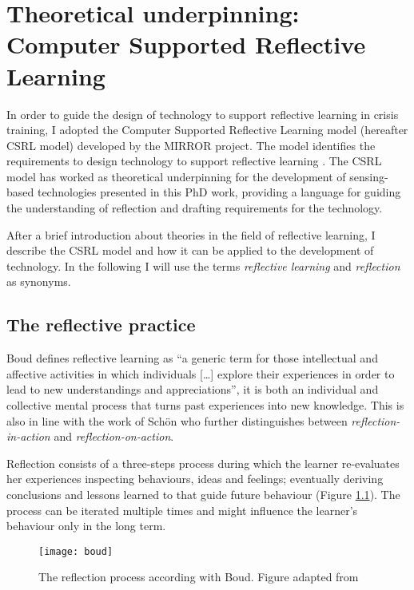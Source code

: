\chapter[Theoretical underpinning:\\ Computer Supported Reflective Learning][Computer Supported Reflective Learning]{Theoretical underpinning: Computer Supported Reflective Learning}\label{csrl}

In order to guide the design of technology to support reflective learning in crisis training, I adopted the Computer Supported Reflective Learning model (hereafter CSRL model) developed by the MIRROR project. The model identifies the requirements to design technology to support reflective learning \autocite{Krogstie:2013kf}. The CSRL model has worked as theoretical underpinning for the development of sensing-based technologies presented in this PhD work, providing a language for guiding the understanding of reflection and drafting requirements for the technology.

After a brief introduction about theories in the field of reflective learning, I describe the CSRL model and how it can be applied to the development of technology. In the following I will use the terms \emph{reflective learning} and \emph{reflection} as synonyms.

\section{The reflective practice}\label{reflection}

Boud \autocite*{boud1985reflection} defines reflective learning as ``a generic term for those intellectual and affective activities in which individuals {[}\ldots{}{]} explore their experiences in order to lead to new understandings and appreciations'', it is both an individual and collective mental process that turns past experiences into new knowledge. This is also in line with the work of Sch\"on \autocite*{Schon:1983ut} who further distinguishes between \emph{reflection-in-action} and \emph{reflection-on-action}.

Reflection consists of a three-steps process during which the learner re-evaluates her experiences inspecting behaviours, ideas and feelings; eventually deriving conclusions and lessons learned to that guide future behaviour (Figure \ref{fig:boud-model}). The process can be iterated multiple times and might influence the learner's behaviour only in the long term.

\begin{figure}
	[tbh] \centering 
	\texttt{[image: boud]} \caption{The reflection process according with Boud. Figure adapted from \protect\autocite{boud1985reflection}} \label{fig:boud-model} 
\end{figure}

